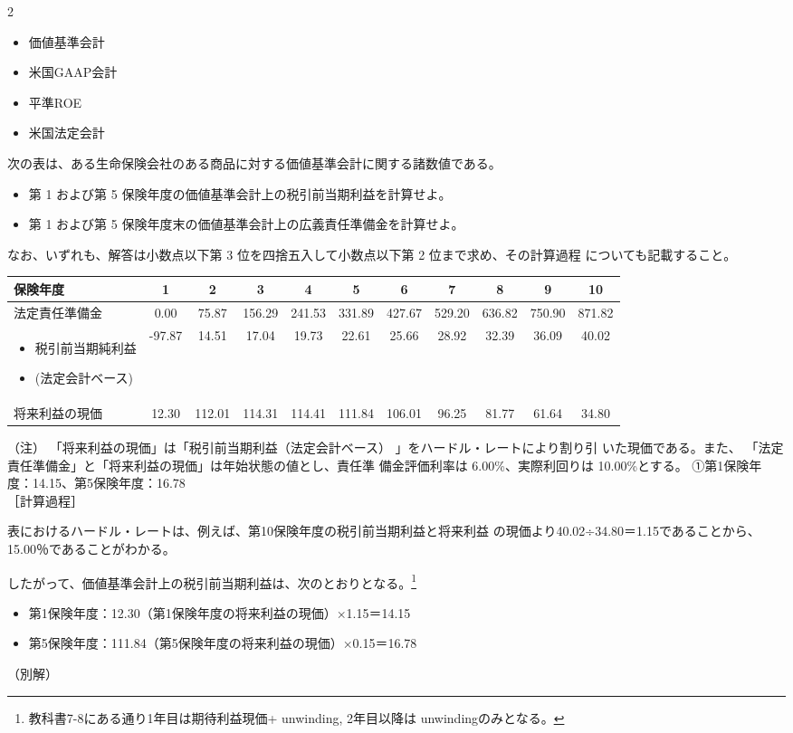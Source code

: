 2\documentclass[report,gutter=10mm,fore-edge=10mm,uplatex,dvipdfmx]{jlreq}
\begin{document}
\begin{itemize}
\item[ 方式①: ] 価値基準会計
\item[ 方式②: ] 米国GAAP会計
\item[ 方式③: ] 平準ROE
\item[ 方式④: ] 米国法定会計
\end{itemize}

次の表は、ある生命保険会社のある商品に対する価値基準会計に関する諸数値である。
\begin{itemize}
\item[① ] 第 1 および第 5 保険年度の価値基準会計上の税引前当期利益を計算せよ。
\item[② ] 第 1 および第 5 保険年度末の価値基準会計上の広義責任準備金を計算せよ。
\end{itemize}
なお、いずれも、解答は小数点以下第 3 位を四捨五入して小数点以下第 2 位まで求め、その計算過程
についても記載すること。

 \begin{tabular}{|p{}|c|c|c|c|c|c|c|c|c|c|}
  \hline
保険年度&1&2&3&4&5&6&7&8&9&10\\ \hline
法定責任準備金&0.00&75.87&156.29&241.53&331.89&427.67&529.20&636.82&750.90&871.82\\ \hline
\begin{itemize}
\item[]  税引前当期純利益
\item[]  (法定会計ベース)
\end{itemize}&
-97.87&14.51&17.04&19.73&22.61&25.66&28.92&32.39&36.09&40.02\\ \hline
将来利益の現価&12.30&112.01&114.31&114.41&111.84&106.01&96.25&81.77&61.64&34.80\\ \hline
 \end{tabular}

（注）
「将来利益の現価」は「税引前当期利益（法定会計ベース）
」をハードル・レートにより割り引
いた現価である。また、
「法定責任準備金」と「将来利益の現価」は年始状態の値とし、責任準
備金評価利率は 6.00\%、実際利回りは 10.00\%とする。
\answer{}
①第1保険年度：14.15、第5保険年度：16.78\\
［計算過程］

表におけるハードル・レートは、例えば、第10保険年度の税引前当期利益と将来利益
の現価より40.02÷34.80＝1.15であることから、15.00％であることがわかる。

したがって、価値基準会計上の税引前当期利益は、次のとおりとなる。\footnote{教科書7-8にある通り1年目は期待利益現価+ unwinding, 2年目以降は unwindingのみとなる。}
\begin{itemize}
\item[]  第1保険年度：12.30（第1保険年度の将来利益の現価）×1.15＝14.15
\item[]  第5保険年度：111.84（第5保険年度の将来利益の現価）×0.15＝16.78
\end{itemize}
（別解）
\end{document}
